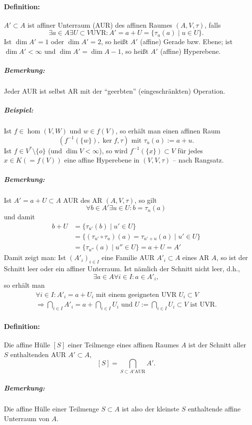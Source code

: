\paragraph{Definition: }
\begin{Definition}
	$ A'\subset A $ ist affiner Unterraum (AUR) des affinen Raumes $ (A,V,\tau) $, falls
		\[ \exists a\in A\exists U\subset V \text{UVR}:A' = a+U = \{\tau_u(a)\mid u\in U\}.\]
	Ist $ \dim A' =1 $ oder $ \dim A' = 2 $, so heißt $ A' $ (affine) Gerade bzw. Ebene; ist $ \dim A' < \infty $ und $ \dim A' = \dim A-1 $, so heißt $ A' $ (affine) Hyperebene.
\end{Definition}
\subparagraph{Bemerkung: }
	Jeder AUR ist selbst AR mit der "`geerbten"' (eingeschränkten) Operation.
\subparagraph{Beispiel: }
	Ist $ f\in \hom(V,W) $ und $ w\in f(V) $, so erhält man einen affinen Raum
		\[ (f^{-1}(\{w\}),\ker f,\tau) \text{ mit }\tau_u(a):= a+u.\]
	Ist $ f\in V^*\setminus \{o\} $ (und $ \dim V<\infty $), so wird $ f^{-1}(\{x\})\subset V $ für jedes $ x\in K (=f(V)) $ eine affine Hyperebene in $ (V,V,\tau) $ -- nach Rangsatz.
	

\subparagraph{Bemerkung: }
	Ist $ A' = a+U\subset A $ AUR des AR $ (A,V,\tau) $, so gilt
		\[ \forall b\in A'\exists u\in U:b=\tau_n(a)\]
	und damit
	\begin{align*}
		b+U&=\{\tau_{u'}(b)\mid u'\in U\}\\
		&=\{(\tau_{u'}\circ \tau_u)(a)=\tau_{u'+u}(a)\mid u'\in U\}\\
		&= \{\tau_{u''}(a)\mid u'' \in U\} = a+U = A'
	\end{align*}
	Damit zeigt man: Ist $ (A'_i)_{i\in I} $ eine Familie AUR $ A'_i\subset A $ eines AR $ A $, so ist der Schnitt leer oder ein affiner Unterraum. Ist nämlich der Schnitt nicht leer, d.h.,
	\[ \exists a\in A\forall i\in I:a\in A'_i, \]
	so erhält man
	\begin{gather*}
		\forall i\in I:A'_i = a+U_i \text{ mit einem geeigneten UVR } U_i\subset V\\
		\Rightarrow \bigcap_{i\in I}A'_i = a+\bigcap_{i\in I}U_i \text{ und } U:= \bigcap_{i\in I}U_i\subset V \text{ ist UVR.}
	\end{gather*}
\paragraph{Definition: }
	\begin{Definition}
		Die affine Hülle $ [S] $ einer Teilmenge eines affinen Raumes $ A $ ist der Schnitt aller $ S $ enthaltenden AUR $ A'\subset A $,
		\[ [S] = \bigcap_{S\subset A' \text{AUR}}A'. \]
	\end{Definition}
\subparagraph{Bemerkung: }
	Die affine Hülle einer Teilmenge $ S\subset A $ ist also der kleinste $ S $ enthaltende affine Unterraum von $ A $.
	
